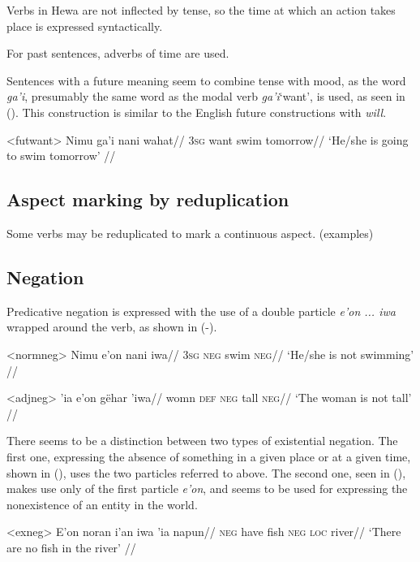 \documentclass[12pt]{article}
\begin{document}
Verbs in Hewa are not inflected by tense, so the time at which an action takes place is expressed syntactically.

For past sentences, adverbs of time are used.

Sentences with a future meaning seem to combine tense with mood, as the word \textit{ga'i}, presumably the same word as the modal verb \textit{ga'i}`want', is used, as seen in (). This construction is similar to the English future constructions with \textit{will}.

\ex<futwant>
\begingl %
\gla Nimu ga'i nani wahat//
\glb \textsc{3sg} want swim tomorrow//
\glft `He/she is going to swim tomorrow' // 
\endgl
\xe

\subsection{Aspect marking by reduplication}

Some verbs may be reduplicated to mark a continuous aspect. (examples)

\subsection{Negation}\label{sec:neg}

Predicative negation is expressed with the use of a double particle \textit{e'on ... iwa} wrapped around the verb, as shown in (-).

\ex<normneg>
\begingl %
\gla Nimu e'on nani iwa//
\glb \textsc{3sg} \textsc{neg} swim \textsc{neg}//
\glft `He/she is not swimming' // 
\endgl
\xe

\ex<adjneg>
\begingl %
 'ia e'on gëhar 'iwa//
\glb womn \textsc{def} \textsc{neg} tall \textsc{neg}//
\glft `The woman is not tall' // 
\endgl
\xe

There seems to be a distinction between two types of existential negation. The first one, expressing the absence of something in a given place or at a given time, shown in (), uses the two particles referred to above. The second one, seen in (), makes use only of the first particle \textit{e'on}, and seems to be used for expressing the nonexistence of an entity in the world.

\ex<exneg>
\begingl %
\gla E'on noran i'an iwa 'ia napun//
\glb \textsc{neg} have fish \textsc{neg} \textsc{loc} river//
\glft `There are no fish in the river' // 
\endgl
\xe
\end{document}
